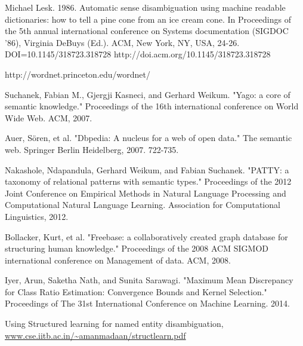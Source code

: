 \begin{thebibliography}{9}
 \label{lesk}
Michael Lesk. 1986. Automatic sense disambiguation using machine readable dictionaries: how to tell a pine cone from an ice cream cone. In Proceedings of the 5th annual international conference on Systems documentation (SIGDOC '86), Virginia DeBuys (Ed.). ACM, New York, NY, USA, 24-26. DOI=10.1145/318723.318728 http://doi.acm.org/10.1145/318723.318728

 \label{wordnet}
http://wordnet.princeton.edu/wordnet/

 \label{yago}
Suchanek, Fabian M., Gjergji Kasneci, and Gerhard Weikum. "Yago: a core of semantic knowledge." Proceedings of the 16th international conference on World Wide Web. ACM, 2007.

 \label{dbpedia}
Auer, Sören, et al. "Dbpedia: A nucleus for a web of open data." The semantic web. Springer Berlin Heidelberg, 2007. 722-735.

 \label{patty}
Nakashole, Ndapandula, Gerhard Weikum, and Fabian Suchanek. "PATTY: a taxonomy of relational patterns with semantic types." Proceedings of the 2012 Joint Conference on Empirical Methods in Natural Language Processing and Computational Natural Language Learning. Association for Computational Linguistics, 2012.

 \label{freebase}
Bollacker, Kurt, et al. "Freebase: a collaboratively created graph database for structuring human knowledge." Proceedings of the 2008 ACM SIGMOD international conference on Management of data. ACM, 2008.

 \label{mmd}
Iyer, Arun, Saketha Nath, and Sunita Sarawagi. "Maximum Mean Discrepancy for Class Ratio Estimation: Convergence Bounds and Kernel Selection." Proceedings of The 31st International Conference on Machine Learning. 2014.

 \label{aidafeature}
Using Structured learning for named entity disambiguation, \url{www.cse.iitb.ac.in/~amanmadaan/structlearn.pdf}
\end{thebibliography}